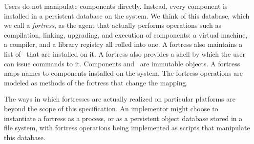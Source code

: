 Users do not manipulate components directly.
Instead,
every component is installed in a persistent database on the system.
We think of this database,
which we call a \emph{fortress},
as the agent that actually performs operations
such as compilation, linking, upgrading,
and execution of components:
a virtual machine, a compiler, and a library registry all rolled into one.
A fortress also maintains a list of \apisN\ that are installed on it.
A fortress also provides a shell
by which the user can issue commands to it.
Components and \apisN\ are immutable objects.
A fortress maps names to components installed on the system.
The fortress operations are modeled
as methods of the fortress that change the mapping.


The ways in which fortresses are actually realized on particular platforms
are beyond the scope of this specification.
An implementor might choose to instantiate a fortress as a process, or as
a persistent object database stored in a file system,
with fortress operations being implemented as scripts
that manipulate this database.
